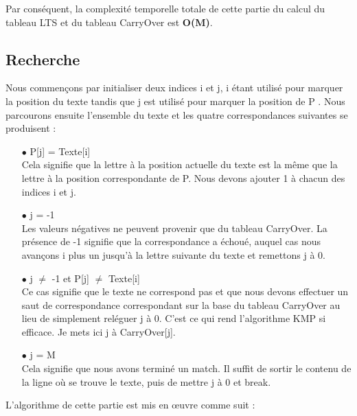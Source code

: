 \documentclass[11pt,english]{article}
\begin{document}
\indent Par conséquent, la complexité temporelle totale de cette partie du calcul du tableau LTS et du tableau CarryOver est \textbf{O(M)}.

\subsection{Recherche}

\indent 

Nous commençons par initialiser deux indices i et j, i étant utilisé pour marquer la position du texte tandis que j est utilisé pour marquer la position de P .
Nous parcourons ensuite l'ensemble du texte et les quatre correspondances suivantes se produisent :

\begin{itemize}
    \item [$\bullet$] P[j] = Texte[i]
    \\
    Cela signifie que la lettre à la position actuelle du texte est la même que la lettre à la position correspondante de P. Nous devons ajouter 1 à chacun des indices i et j.
    \item [$\bullet$] j = -1
    \\
    Les valeurs négatives ne peuvent provenir que du tableau CarryOver. La présence de -1 signifie que la correspondance a échoué, auquel cas nous avançons i plus un jusqu'à la lettre suivante du texte et remettons j à 0.
    \item [$\bullet$] j $\neq$ -1 et P[j] $\neq$ Texte[i]
    \\
    Ce cas signifie que le texte ne correspond pas et que nous devons effectuer un saut de correspondance correspondant sur la base du tableau CarryOver au lieu de simplement reléguer j à 0. C'est ce qui rend l'algorithme KMP si efficace. Je mets ici j à CarryOver[j].
    \item [$\bullet$] j = M
    \\
    Cela signifie que nous avons terminé un match. Il suffit de sortir le contenu de la ligne où se trouve le texte, puis de mettre j à 0 et break. 

\end{itemize}

\indent L'algorithme de cette partie est mis en œuvre comme suit :
\end{document}
